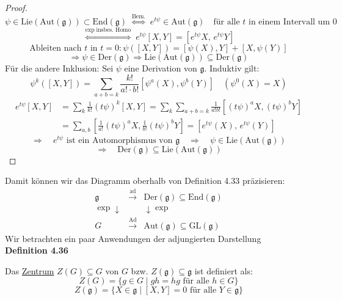 \documentclass[fleqn, 12pt, letterpaper]{article}
\newcommand{\txt}[1]{\text{#1}}
\begin{document}
\begin{proof}
    \[
\psi \in \mathrm{Lie} \left( \mathrm{Aut}(\mathfrak{g}) \right) 
\subset \mathrm{End}(\mathfrak{g}) 
\;\overset{\txt{Bem.}}{\Longleftrightarrow}\; 
e^{t\psi} \in \mathrm{Aut}(\mathfrak{g}) 
\quad \text{für alle } t \text{ in einem Intervall um } 0
\]
\[
\overset{\exp \;\txt{insbes. Homo}}{\Longleftrightarrow}\; 
e^{t\psi} [X, Y] = [e^{t\psi} X,\, e^{t\psi} Y]
\]
\[
\text{Ableiten nach } t \text{ in } t = 0: 
\psi([X, Y]) = [\psi(X), Y] + [X, \psi(Y)]
\]
\[\Rightarrow \psi \in \mathrm{Der}(\mathfrak{g})
\Rightarrow \mathrm{Lie}(\mathrm{Aut}(\mathfrak{g})) \subseteq \mathrm{Der}(\mathfrak{g})\]
{Für die andere Inklusion:}
Sei \(\psi\) eine Derivation von \(\mathfrak{g}\). Induktiv gilt:
\[
\psi^k([X, Y]) = \sum_{a + b = k} \frac{k!}{a! \cdot b!} \left[ \psi^a(X), \psi^b(Y) \right] \quad (\psi^0(X)=X)
\]
\begin{align*}
e^{t\psi} [X, Y] 
&= \sum_{k} \frac{1}{k!} (t\psi)^k [X, Y] = \sum_{k} \sum_{a + b = k} \frac{1}{a! b!} \left[ (t\psi)^a X, (t\psi)^b Y \right] \\
&= \sum_{a, b} \left[ \frac{1}{a!} (t\psi)^a X, \frac{1}{b!} (t\psi)^b Y \right] = \left[ e^{t\psi}(X),\, e^{t\psi}(Y) \right]
\end{align*}
\[
\Rightarrow \quad e^{t\psi} \text{ ist ein Automorphismus von } \mathfrak{g}
\quad \Rightarrow \quad \psi \in \mathrm{Lie}(\mathrm{Aut}(\mathfrak{g}))
\]
\[
\Rightarrow \quad \mathrm{Der}(\mathfrak{g}) \subseteq \mathrm{Lie}(\mathrm{Aut}(\mathfrak{g}))
\]
\end{proof}
Damit können wir das Diagramm oberhalb von Definition 4.33 präzisieren:
\[
\begin{array}{ccc}
\mathfrak{g} & \xrightarrow{\mathrm{ad}} & \mathrm{Der}(\mathfrak{g}) \subseteq \mathrm{End}(\mathfrak{g}) \\
\exp \downarrow &  & \downarrow \exp \\
G & \xrightarrow{\mathrm{Ad}} & \mathrm{Aut}(\mathfrak{g}) \subseteq \mathrm{GL}(\mathfrak{g})
\end{array}
\]
Wir betrachten ein paar Anwendungen der adjungierten Darstellung\\

\textbf{Definition 4.36}

Das \underline{Zentrum} \( Z(G) \subseteq G \) von \( G \) bzw. \( Z(\mathfrak{g}) \subseteq \mathfrak{g} \) ist definiert als:
\[
Z(G) = \{ g \in G \mid gh = hg \text{ für alle } h \in G \}
\]
\[
Z(\mathfrak{g}) = \{ X \in \mathfrak{g} \mid [X, Y] = 0 \text{ für alle } Y \in \mathfrak{g} \}
\]
\end{document}
